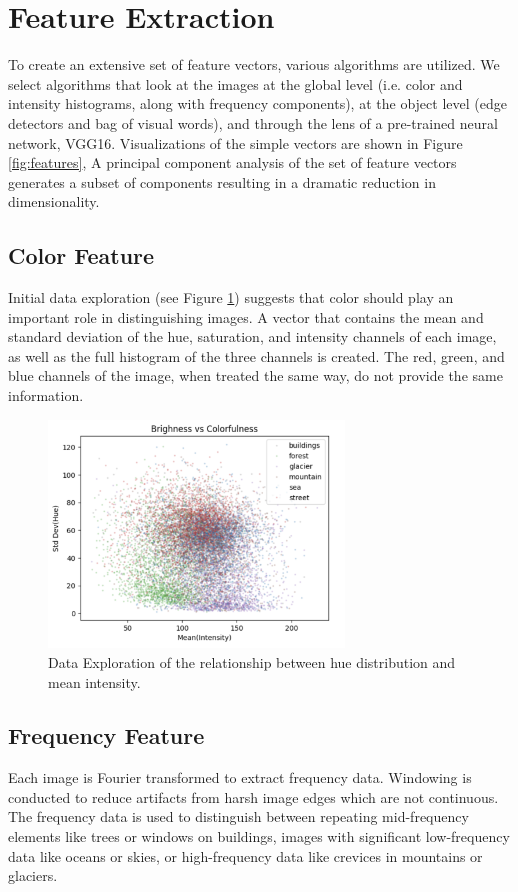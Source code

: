 \documentclass[11pt]{article}
\begin{document}
\section{Feature Extraction}
To create an extensive set of feature vectors, various algorithms are utilized. We select algorithms that look at the images at the global level (i.e. color and intensity histograms, along with frequency components), at the object level (edge detectors and bag of visual words), and through the lens of a pre-trained neural network, VGG16. Visualizations of the simple vectors are shown in Figure \ref{fig:features}, A principal component analysis of the set of feature vectors generates a subset of components resulting in a dramatic reduction in dimensionality.

\subsection{Color Feature}
Initial data exploration (see Figure \ref{fig:color_eda}) suggests that color should play an important role in distinguishing images. A vector that contains the mean and standard deviation of the hue, saturation, and intensity channels of each image, as well as the full histogram of the three channels is created. The red, green, and blue channels of the image, when treated the same way, do not provide the same information.

\begin{figure}[h!]
\centering
\includegraphics[width=0.7\textwidth]{color_eda.png}
\caption{Data Exploration of the relationship between hue distribution and mean intensity.}
\label{fig:color_eda}
\end{figure}

\subsection{Frequency Feature}
Each image is Fourier transformed to extract frequency data. Windowing is conducted to reduce artifacts from harsh image edges which are not continuous. The frequency data is used to distinguish between repeating mid-frequency elements like trees or windows on buildings, images with significant low-frequency data like oceans or skies, or high-frequency data like crevices in mountains or glaciers.
\end{document}
